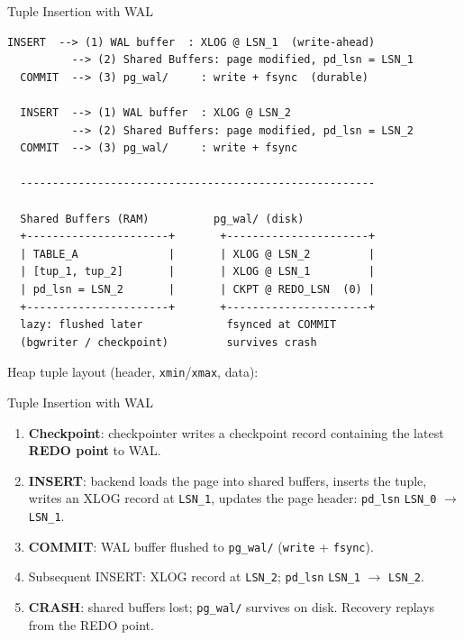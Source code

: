 \documentclass[aspectratio=169,10pt]{beamer}
\begin{document}
\begin{frame}[fragile,label=frTupleInsert]{Tuple Insertion with WAL}

\begin{lstlisting}[style=ascii]
  INSERT  --> (1) WAL buffer  : XLOG @ LSN_1  (write-ahead)
          --> (2) Shared Buffers: page modified, pd_lsn = LSN_1
  COMMIT  --> (3) pg_wal/     : write + fsync  (durable)

  INSERT  --> (1) WAL buffer  : XLOG @ LSN_2
          --> (2) Shared Buffers: page modified, pd_lsn = LSN_2
  COMMIT  --> (3) pg_wal/     : write + fsync

  -------------------------------------------------------

  Shared Buffers (RAM)          pg_wal/ (disk)
  +----------------------+       +----------------------+
  | TABLE_A              |       | XLOG @ LSN_2         |
  | [tup_1, tup_2]       |       | XLOG @ LSN_1         |
  | pd_lsn = LSN_2       |       | CKPT @ REDO_LSN  (0) |
  +----------------------+       +----------------------+
  lazy: flushed later             fsynced at COMMIT
  (bgwriter / checkpoint)         survives crash
\end{lstlisting}

{\tiny Heap tuple layout (header, \texttt{xmin}/\texttt{xmax}, data):
\hyperlink{frA3}{}\par}

\end{frame}

\begin{frame}{Tuple Insertion with WAL}

  \begin{enumerate}\small
    \setcounter{enumi}{-1}
    \item {\color{gray}\textbf{Checkpoint}: checkpointer writes a
          checkpoint record containing the latest \textbf{REDO point} to WAL.}
    \item \textbf{INSERT}: backend loads the page into shared buffers,
          inserts the tuple, writes an XLOG record at \texttt{LSN\_1},
          updates the page header: \texttt{pd\_lsn} \texttt{LSN\_0}
          $\to$ \texttt{LSN\_1}.
    \item \textbf{COMMIT}: WAL buffer flushed to \texttt{pg\_wal/}
          (\texttt{write} + \texttt{fsync}).
    \item Subsequent INSERT: XLOG record at \texttt{LSN\_2};
          \texttt{pd\_lsn} \texttt{LSN\_1} $\to$ \texttt{LSN\_2}.
    \item \textbf{CRASH}: shared buffers lost; \texttt{pg\_wal/}
          survives on disk. Recovery replays from the REDO point.
  \end{enumerate}

\end{frame}
\end{document}
